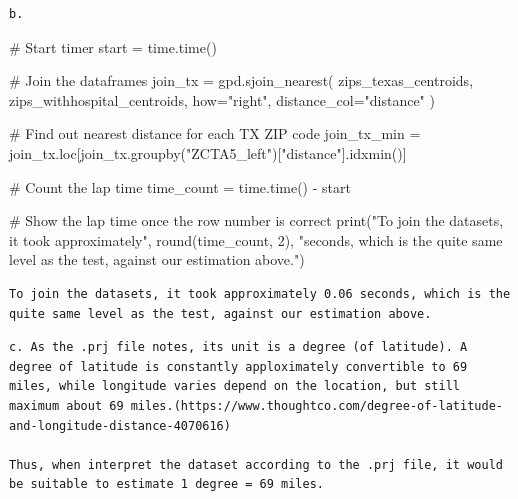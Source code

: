\documentclass[
  letterpaper,
  DIV=11,
  numbers=noendperiod]{scrartcl}
\newenvironment{Shaded}{\begin{snugshade}}{\end{snugshade}}
\newcommand{\BuiltInTok}[1]{\textcolor[rgb]{0.00,0.23,0.31}{#1}}
\newcommand{\CommentTok}[1]{\textcolor[rgb]{0.37,0.37,0.37}{#1}}
\newcommand{\DecValTok}[1]{\textcolor[rgb]{0.68,0.00,0.00}{#1}}
\newcommand{\NormalTok}[1]{\textcolor[rgb]{0.00,0.23,0.31}{#1}}
\newcommand{\OperatorTok}[1]{\textcolor[rgb]{0.37,0.37,0.37}{#1}}
\newcommand{\StringTok}[1]{\textcolor[rgb]{0.13,0.47,0.30}{#1}}
\begin{document}
\begin{verbatim}
b.
\end{verbatim}

\begin{Shaded}
\begin{Highlighting}[]
\CommentTok{\# Start timer}
\NormalTok{start }\OperatorTok{=}\NormalTok{ time.time()}

\CommentTok{\# Join the dataframes}
\NormalTok{join\_tx }\OperatorTok{=}\NormalTok{ gpd.sjoin\_nearest(}
\NormalTok{    zips\_texas\_centroids,}
\NormalTok{    zips\_withhospital\_centroids,}
\NormalTok{    how}\OperatorTok{=}\StringTok{"right"}\NormalTok{,}
\NormalTok{    distance\_col}\OperatorTok{=}\StringTok{"distance"}
\NormalTok{)}

\CommentTok{\# Find out nearest distance for each TX ZIP code}
\NormalTok{join\_tx\_min }\OperatorTok{=}\NormalTok{ join\_tx.loc[join\_tx.groupby(}\StringTok{"ZCTA5\_left"}\NormalTok{)[}\StringTok{"distance"}\NormalTok{].idxmin()]}

\CommentTok{\# Count the lap time}
\NormalTok{time\_count }\OperatorTok{=}\NormalTok{ time.time() }\OperatorTok{{-}}\NormalTok{ start}

\CommentTok{\# Show the lap time once the row number is correct}
\BuiltInTok{print}\NormalTok{(}\StringTok{"To join the datasets, it took approximately"}\NormalTok{,}
      \BuiltInTok{round}\NormalTok{(time\_count, }\DecValTok{2}\NormalTok{), }\StringTok{"seconds, which is the quite same level as the test, against our estimation above."}\NormalTok{)}
\end{Highlighting}
\end{Shaded}

\begin{verbatim}
To join the datasets, it took approximately 0.06 seconds, which is the quite same level as the test, against our estimation above.
\end{verbatim}

\begin{verbatim}
c. As the .prj file notes, its unit is a degree (of latitude). A degree of latitude is constantly apploximately convertible to 69 miles, while longitude varies depend on the location, but still maximum about 69 miles.(https://www.thoughtco.com/degree-of-latitude-and-longitude-distance-4070616)

Thus, when interpret the dataset according to the .prj file, it would be suitable to estimate 1 degree = 69 miles.
\end{verbatim}
\end{document}
